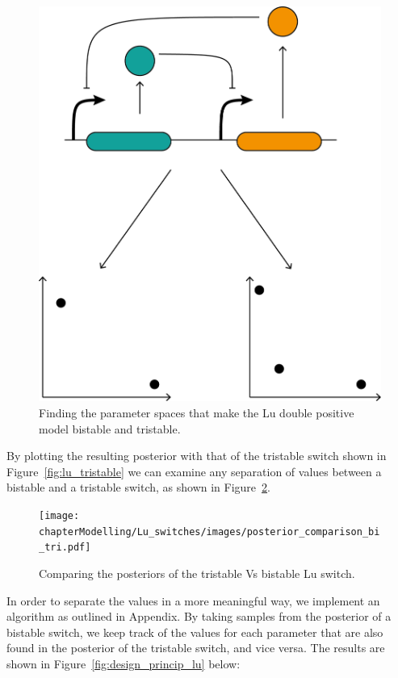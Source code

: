 \begin{figure}[h]
\centering
\includegraphics[scale=0.5]{chapterModelling/Lu_switches/images/lu_bi_tri_cartoon.png}
\caption{Finding the parameter spaces that make the Lu double positive model bistable and tristable. }
\label{fig:lu_bi_tri_cartoon}
\end{figure}

By plotting the resulting posterior with that of the tristable switch shown in Figure~\ref{fig:lu_tristable} we can examine any separation of values between a bistable and a tristable switch, as shown in Figure~\ref{fig:pos_comp_lu}.

\begin{figure}[h]
\centering
\texttt{[image: chapterModelling/Lu\_switches/images/posterior\_comparison\_bi\_tri.pdf]}
\caption{Comparing the posteriors of the tristable Vs bistable Lu switch.}
\label{fig:pos_comp_lu}
\end{figure}
\clearpage

In order to separate the values in a more meaningful way, we implement an algorithm as outlined in Appendix. By taking samples from the posterior of a bistable switch, we keep track of the values for each parameter that are also found in the posterior of the tristable switch, and vice versa. The results are shown in Figure~\ref{fig:design_princip_lu} below:


